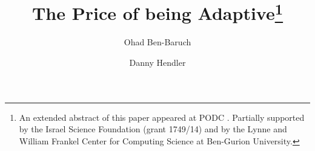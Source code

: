
\title{The Price of being Adaptive\thanks{
				An extended abstract of this paper appeared at PODC \cite{DBLP:conf/podc/Ben-BaruchH15}.
                Partially supported by the Israel Science Foundation
                (grant 1749/14) and by the Lynne and William Frankel Center for Computing Science at Ben-Gurion University.}}

\author{Ohad Ben-Baruch         \and
	Danny Hendler
}


		
\maketitle


